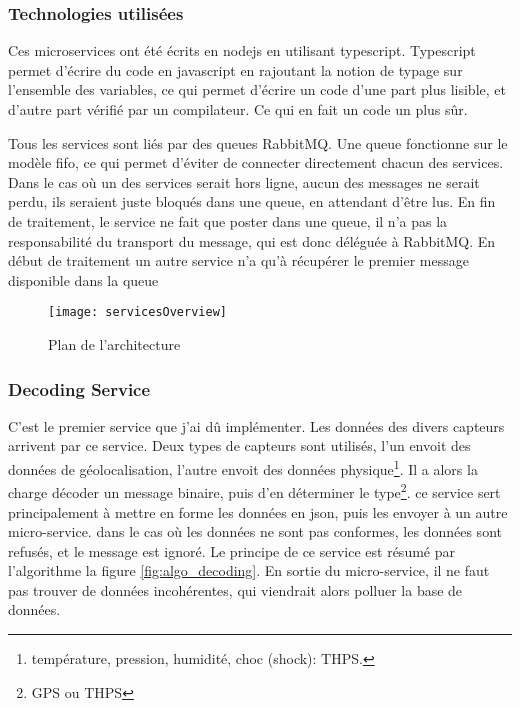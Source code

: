 \documentclass[../rapport.tex]{subfiles}
\begin{document}
        \subsubsection{Technologies utilisées}
            Ces microservices ont été écrits en nodejs en utilisant typescript.
            Typescript permet d'écrire du code en javascript en rajoutant la notion de
            typage sur l'ensemble des variables, ce qui permet d'écrire un code d'une part
            plus lisible, et d'autre part vérifié par un compilateur. Ce qui en fait un code un
            plus sûr.

            Tous les services sont liés par des queues RabbitMQ. Une queue
            fonctionne sur le modèle \gls{fifo}, ce qui permet
            d'éviter de connecter directement chacun des services. Dans le cas
            où un des services serait hors ligne, aucun des messages ne serait
            perdu, ils seraient juste bloqués dans une queue, en attendant
            d'être lus. En fin de traitement, le service ne fait que poster
            dans une queue, il n'a pas la responsabilité du transport du
            message, qui est donc déléguée à RabbitMQ. En début de traitement
            un autre service n'a qu'à récupérer le premier message disponible
            dans la queue

        \begin{figure}
            \centering
            \texttt{[image: servicesOverview]}
            \caption{Plan de l'architecture}\label{fig:overview}
        \end{figure}

        \subsubsection{Decoding Service}
        C'est le premier service que j'ai dû implémenter. 
        Les données des divers capteurs arrivent par ce service. Deux types de
        capteurs sont utilisés, l'un envoit des données de géolocalisation,
        l'autre envoit des données physique\footnote{température, pression,
        humidité, choc (shock): THPS.}. Il a alors la charge décoder un message
        binaire, puis d'en déterminer le type\footnote{GPS ou THPS}. ce service
        sert principalement à mettre en forme les données en \gls{json}, puis
        les envoyer à un autre micro-service. dans le cas où les données ne
        sont pas conformes, les données sont refusés, et le message est ignoré.
        Le principe de ce service est résumé par l'algorithme la figure
        \ref{fig:algo_decoding}.
        En sortie du micro-service, il ne faut pas trouver de données
        incohérentes, qui viendrait alors 
        polluer la base de données.
\end{document}
